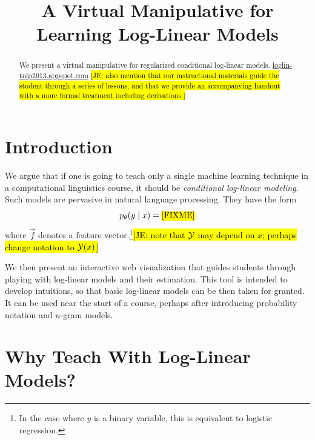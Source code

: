 \documentclass[11pt,letterpaper]{article}
\title{A Virtual Manipulative for Learning Log-Linear Models}
\author{
 }
\date{}
\newcommand{\Note}[1]{}
\renewcommand{\Note}[1]{\hl{[#1]}}
\newcommand{\FIXME}{\Note{FIXME}}
\newcommand{\NoteSigned}[3]{{\sethlcolor{#2}\Note{#1: #3}}}
\newcommand{\NoteJE}[1]{\NoteSigned{JE}{LightGreen}{#1}}
\newcommand{\WhereToFind}[0]{\url{loglin-tnlp2013.appspot.com}}
\begin{document}
\maketitle

\begin{abstract}
We present a virtual manipulative for regularized conditional log-linear models. \WhereToFind{}
\NoteJE{also mention that our instructional materials guide the student through a series of lessons, and that we provide an accompanying handout with a more formal treatment including derivations.}
\end{abstract}

\section{Introduction}\label{sec:intro}

We argue that if one is going to teach only a single machine learning
technique in a computational linguistics course, it should be {\em
  conditional log-linear modeling}.  Such models are pervasive in
natural language processing.  They have the form
\begin{equation}\label{eq:loglin}
p_\theta(y \mid x) = \mbox{\FIXME}
\end{equation}
where $\vec{f}$ denotes a feature vector.\footnote{In the case where $y$ is a
binary variable, this is equivalent to logistic
regression.}\NoteJE{note that ${\cal Y}$ may depend on $x$; perhaps
change notation to ${\cal Y}(x)$}


We then present an interactive web visualization that guides students
through playing with log-linear models and their estimation.  This
tool is intended to develop intuitions, so that basic log-linear
models can be then taken for granted.  It can be used near the start
of a course, perhaps after introducing probability notation and
$n$-gram models.

\section{Why Teach With Log-Linear Models?}
\end{document}

